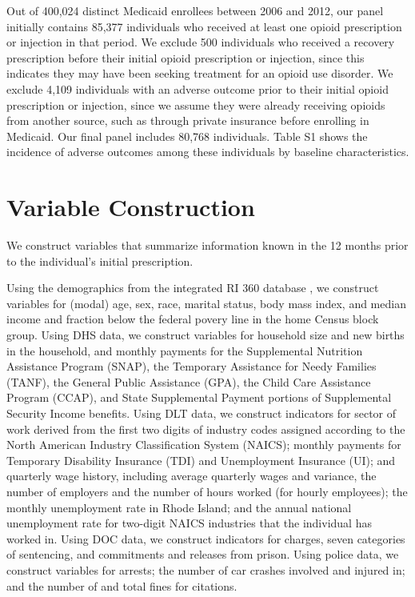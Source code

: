 \documentclass[9pt,twoside]{pnas-new}
\begin{document}
Out of 400,024 distinct Medicaid enrollees between 2006 and 2012, our panel initially contains 85,377 individuals who received at least one opioid prescription or injection in that period. We exclude 500 individuals who received a recovery prescription before their initial opioid prescription or injection, since this indicates they may have been seeking treatment for an opioid use disorder. We exclude 4,109 individuals with an adverse outcome prior to their initial opioid prescription or injection, since we assume they were already receiving opioids from another source, such as through private insurance before enrolling in Medicaid. Our final panel includes 80,768 individuals. Table S1 shows the incidence of adverse outcomes among these individuals by baseline characteristics.

\section{Variable Construction}

We construct variables that summarize information known in the 12 months prior to the individual's initial prescription.

Using the demographics from the integrated RI 360 database \cite{hastings}, we construct variables for (modal) age, sex, race, marital status, body mass index, and median income and fraction below the federal povery line in the home Census block group. Using DHS data, we construct variables for household size and new births in the household, and monthly payments for the Supplemental Nutrition Assistance Program (SNAP), the Temporary Assistance for Needy Families (TANF), the General Public Assistance (GPA), the Child Care Assistance Program (CCAP), and State Supplemental Payment portions of Supplemental Security Income benefits. Using DLT data, we construct indicators for sector of work derived from the first two digits of industry codes assigned according to the North American Industry Classification System (NAICS); monthly payments for Temporary Disability Insurance (TDI) and Unemployment Insurance (UI); and quarterly wage history, including average quarterly wages and variance, the number of employers and the number of hours worked (for hourly employees); the monthly unemployment rate in Rhode Island; and the annual national unemployment rate for two-digit NAICS industries that the individual has worked in. Using DOC data, we construct indicators for charges, seven categories of sentencing, and commitments and releases from prison. Using police data, we construct variables for arrests; the number of car crashes involved and injured in; and the number of and total fines for citations.
\end{document}
